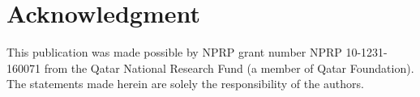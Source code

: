 \documentclass[journal,comsoc]{IEEEtran}
\begin{document}
%
\section*{Acknowledgment}
%
This publication was made possible by NPRP grant number NPRP 10-1231-160071 from the Qatar National Research Fund (a member of Qatar Foundation). The statements made herein are solely the responsibility of the authors.


\ifCLASSOPTIONcaptionsoff
\newpage
\fi





%
%
%

% 

\end{document}
